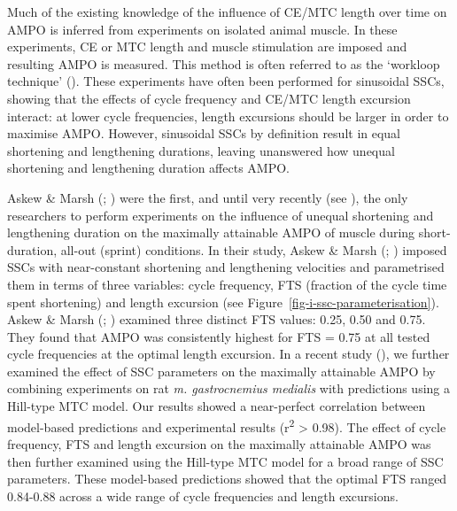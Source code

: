 \documentclass[
  11pt,
  a4paper]{article}
\begin{document}
Much of the existing knowledge of the influence of CE/MTC length over
time on AMPO is inferred from experiments on isolated animal muscle. In
these experiments, CE or MTC length and muscle stimulation are imposed
and resulting AMPO is measured. This method is often referred to as the
`workloop technique'
(). These
experiments have often been performed for sinusoidal SSCs, showing that
the effects of cycle frequency and CE/MTC length excursion interact: at
lower cycle frequencies, length excursions should be larger in order to
maximise AMPO. However, sinusoidal SSCs by definition result in equal
shortening and lengthening durations, leaving unanswered how unequal
shortening and lengthening duration affects AMPO.

Askew \& Marsh (;
) were the first, and until very
recently (see ), the only researchers to perform experiments on the influence of
unequal shortening and lengthening duration on the maximally attainable
AMPO of muscle during short-duration, all-out (sprint) conditions. In
their study, Askew \& Marsh (;
) imposed SSCs with near-constant
shortening and lengthening velocities and parametrised them in terms of
three variables: cycle frequency, FTS (fraction of the cycle time spent
shortening) and length excursion (see
Figure~\ref{fig-i-ssc-parameterisation}). Askew \& Marsh
(;
) examined three distinct FTS
values: 0.25, 0.50 and 0.75. They found that AMPO was consistently
highest for FTS = 0.75 at all tested cycle frequencies at the optimal
length excursion. In a recent study
(), we
further examined the effect of SSC parameters on the maximally
attainable AMPO by combining experiments on rat \emph{m. gastrocnemius
medialis} with predictions using a Hill-type MTC model. Our results
showed a near-perfect correlation between model-based predictions and
experimental results (r\textsuperscript{2} \textgreater{} 0.98). The
effect of cycle frequency, FTS and length excursion on the maximally
attainable AMPO was then further examined using the Hill-type MTC model
for a broad range of SSC parameters. These model-based predictions
showed that the optimal FTS ranged 0.84-0.88 across a wide range of
cycle frequencies and length excursions.
\end{document}
